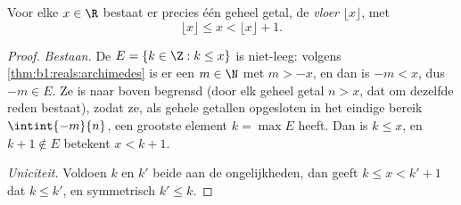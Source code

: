 \begin{theorem}[Vloerfunctie]\label{thm:b1:reals:floor}
Voor elke $x \in \R$ bestaat er precies één geheel getal, de
\emph{vloer} $\lfloor x \rfloor$, met
\[
\lfloor x \rfloor \leq x < \lfloor x \rfloor + 1 .
\]
\end{theorem}

\begin{proof}
\emph{Bestaan.} De  $E = \{k \in \Z : k \leq x\}$ is
niet-leeg: volgens \cref{thm:b1:reals:archimedes} is er een $m \in \N$
met $m > -x$, en dan is $-m < x$, dus $-m \in E$. Ze is naar boven
begrensd (door elk geheel getal $n > x$, dat om dezelfde reden bestaat),
zodat ze, als  gehele getallen opgesloten in het eindige
bereik $\intint{-m}{n}$, een grootste element $k = \max E$ heeft. Dan is
$k \leq x$, en $k + 1 \notin E$ betekent $x < k + 1$.

\emph{Uniciteit.} Voldoen $k$ en $k'$ beide aan de ongelijkheden, dan
geeft $k \leq x < k' + 1$ dat $k \leq k'$, en symmetrisch $k' \leq k$.
\end{proof}

